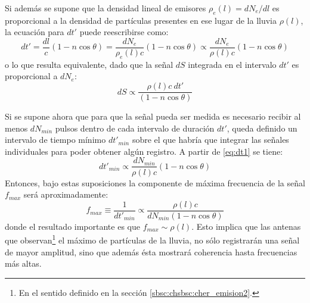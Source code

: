 	Si adem\'as se supone que la densidad lineal de emisores $\rho_e(l) = dN_e/dl$ es proporcional a la densidad de part\'iculas presentes en ese lugar de la lluvia $\rho(l)$, la ecuaci\'on para $dt'$ puede reescribirse como:
	\begin{equation}
	 dt' = \frac{dl}{c}(1-n\cos\theta) = \frac{dN_e}{\rho_e(l) c}(1-n\cos\theta)\propto \frac{dN_e}{\rho(l) c}(1-n\cos\theta)
	 \label{eq:dt1}
	\end{equation}
	o lo que resulta equivalente, dado que la se\~nal $dS$ integrada en el intervalo $dt'$ es proporcional a $dN_e$:
	\begin{equation}
	 dS\propto\frac{\rho(l)c\ dt'}{(1-n\cos\theta)}
	 \label{eq:dS1}
	\end{equation}
	

	Si se supone ahora que para que la se\~nal pueda ser medida es necesario recibir al menos $dN_{min}$ pulsos dentro de cada intervalo de duraci\'on $dt'$, queda definido un intervalo de tiempo m\'inimo $dt'_{min}$ sobre el que habr\'ia que integrar las se\~nales individuales para poder obtener alg\'un registro. A partir de \ref{eq:dt1} se tiene:
	\begin{equation}
	 dt'_{min} \propto \frac{dN_{min}}{\rho(l) c}(1-n\cos\theta)
	\end{equation}
	Entonces, bajo estas suposiciones la componente de m\'axima frecuencia de la se\~nal $f_{max}$  ser\'a aproximadamente:
	\begin{equation}
	 f_{max}\equiv \frac{1}{dt'_{min}} \propto \frac{\rho(l) c}{dN_{min}(1-n\cos\theta)}
	\end{equation}
	donde el resultado importante es que $f_{max}\sim\rho(l)$. 
	Esto implica que las antenas que observan\footnote{En el sentido definido en la secci\'on \ref{sbsc:chsbsc:cher_emision2}.} el m\'aximo de part\'iculas de la lluvia, no s\'olo registrar\'an una se\~nal de mayor amplitud, sino que adem\'as \'esta mostrar\'a coherencia hasta frecuencias m\'as altas.
	
